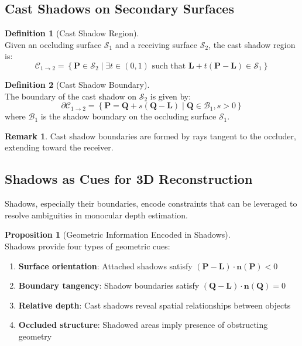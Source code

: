 \documentclass[12pt]{article}
\newcommand{\vect}[1]{\bm{#1}}
\theoremstyle{definition}
\newtheorem{definition}{Definition}[section]
\newtheorem{proposition}{Proposition}[section]
\newtheorem{remark}{Remark}[section]
\begin{document}
\newpage

\subsection{Cast Shadows on Secondary Surfaces}

\begin{definition}[Cast Shadow Region] ~\\
Given an occluding surface $\mathcal{S}_1$ and a receiving surface $\mathcal{S}_2$, the cast shadow region is:
\begin{equation}
\boxed{
\mathcal{C}_{1 \to 2} = \left\{ \vect{P} \in \mathcal{S}_2 \mid \exists t \in (0,1) \text{ such that } \vect{L} + t(\vect{P} - \vect{L}) \in \mathcal{S}_1
\right\}
}
\end{equation}
\end{definition}

\begin{definition}[Cast Shadow Boundary] ~\\
The boundary of the cast shadow on $\mathcal{S}_2$ is given by:
\begin{equation}
\boxed{
\partial\mathcal{C}_{1 \to 2} = \left\{ \vect{P} = \vect{Q} + s(\vect{Q} - \vect{L}) \mid \vect{Q} \in \mathcal{B}_1, s > 0 \right\}
}
\end{equation}
where $\mathcal{B}_1$ is the shadow boundary on the occluding surface $\mathcal{S}_1$.
\end{definition}

\begin{remark}
Cast shadow boundaries are formed by rays tangent to the occluder, extending toward the receiver.
\end{remark}

\subsection{Shadows as Cues for 3D Reconstruction}

Shadows, especially their boundaries, encode constraints that can be leveraged to resolve ambiguities in monocular depth estimation.

\begin{proposition}[Geometric Information Encoded in Shadows] ~\\
Shadows provide four types of geometric cues:
\begin{enumerate}[label=(\roman*)]
\item \textbf{Surface orientation}: Attached shadows satisfy $(\vect{P} - \vect{L}) \cdot \vect{n}(\vect{P}) < 0$
\item \textbf{Boundary tangency}: Shadow boundaries satisfy $(\vect{Q} - \vect{L}) \cdot \vect{n}(\vect{Q}) = 0$
\item \textbf{Relative depth}: Cast shadows reveal spatial relationships between objects
\item \textbf{Occluded structure}: Shadowed areas imply presence of obstructing geometry
\end{enumerate}
\end{proposition}
\end{document}

